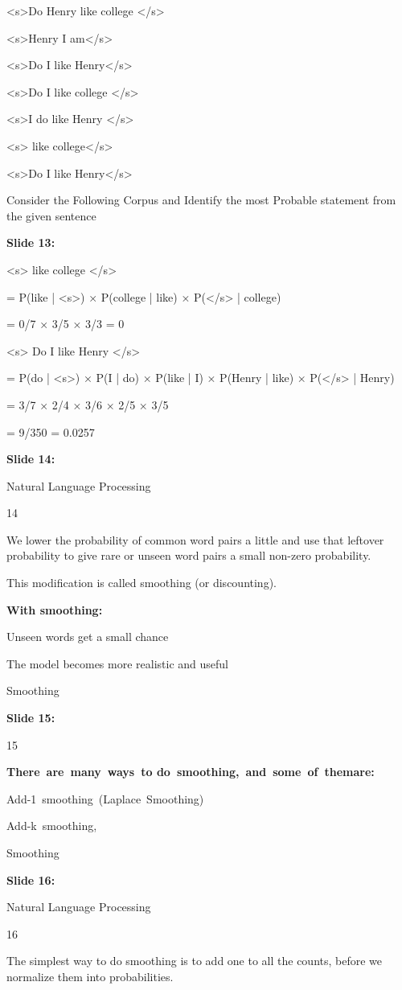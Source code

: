 \documentclass[11pt,a4paper]{article}
\begin{document}
<s>Do Henry like college </s>

<s>Henry I am</s>

<s>Do I like Henry</s>

<s>Do I like college </s>

<s>I do like Henry </s>

<s> like college</s>

<s>Do I like Henry</s>

Consider the Following Corpus and Identify the most Probable statement from the given sentence

\textbf{Slide 13:}

<s> like college </s>

= P(like | <s>) × P(college | like) × P(</s> | college)

= 0/7 × 3/5 × 3/3 = 0

<s> Do I like Henry </s>

= P(do | <s>) × P(I | do) × P(like | I) × P(Henry | like) × P(</s> | Henry)

= 3/7 × 2/4 × 3/6 × 2/5 × 3/5

= 9/350 = 0.0257

\textbf{Slide 14:}

Natural Language Processing

14

We lower the probability of common word pairs a little and use that leftover probability to give rare or unseen word pairs a small non-zero probability.

This modification is called smoothing (or discounting).

\textbf{With smoothing:} 

Unseen words get a small chance

The model becomes more realistic and useful

Smoothing

\textbf{Slide 15:}

15

\textbf{There are many ways to do smoothing, and some of themare:} 

Add-1 smoothing (Laplace Smoothing)

Add-k smoothing,

Smoothing

\textbf{Slide 16:}

Natural Language Processing

16

The simplest way to do smoothing is to add one to all the counts, before we  normalize them into probabilities.
\end{document}
